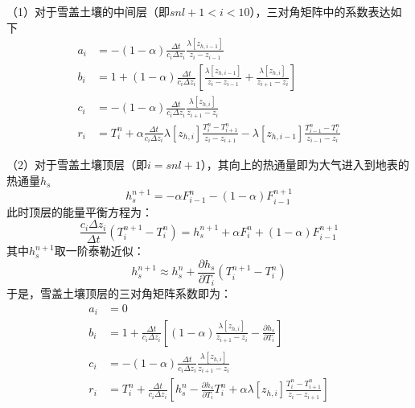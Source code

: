 （1）对于雪盖土壤的中间层（即$snl+1<i<10$），三对角矩阵中的系数表达如下
\begin{equation}
    \begin{aligned}
        a_i &= -\left(1-\alpha \right) \frac{\Delta t}{c_i \Delta z_i} \frac{\lambda \left[z_{h,i-1}\right]}{z_i-z_{i-1}} \\
        b_i &= 1+\left(1-\alpha \right) \frac{\Delta t}{c_i \Delta z_i} \left[\frac{\lambda \left[z_{h,i-1}\right]}{z_i-z_{i-1}} + \frac{\lambda \left[z_{h,i}\right]}{z_{i+1}-z_i}\right] \\
        c_i &= -\left(1-\alpha \right)\frac{\Delta t}{c_i\Delta z_i}\frac{\lambda \left[z_{h,i}\right]}{z_{i+1}-z_i} \\
        r_i &= T_{i}^{n}+\alpha \frac{\Delta t}{c_{i} \Delta z_{i}} \lambda\left[z_{h, i}\right] \frac{T_{i}^{n}-T_{i+1}^{n}}{z_{i}-z_{i+1}}-\lambda\left[z_{h, i-1}\right] \frac{T_{i-1}^{n}-T_{i}^{n}}{z_{i-1}-z_{i}}
    \end{aligned}
\end{equation}

（2）对于雪盖土壤顶层（即$i=snl+1$），其向上的热通量即为大气进入到地表的热通量$h_s$
\begin{equation}
    h^{n+1}_s=-\alpha F^n_{i-1}-\left(1-\alpha\right)F^{n+1}_{i-1}
\end{equation}
此时顶层的能量平衡方程为：
\begin{equation}
    \frac{c_i\Delta z_i}{\Delta t}\left(T^{n+1}_i-T^n_i\right) = h^{n+1}_s+\alpha F^n_i+\left(1-\alpha \right)F^{n+1}_{i-1}
\end{equation}
其中$h^{n+1}_s$取一阶泰勒近似：
\begin{equation}
    h^{n+1}_s \approx h^n_s + \frac{\partial h_s}{\partial T_i}\left(T^{n+1}_i-T^n_i\right)
\end{equation}
于是，雪盖土壤顶层的三对角矩阵系数即为：
\begin{equation}
\begin{aligned}
    a_{i} &= 0 \\ 
    b_{i} &= 1+\frac{\Delta t}{c_{i} \Delta z_{i}}\left[(1-\alpha) \frac{\lambda\left[z_{h, i}\right]}{z_{i+1}-z_{i}}-\frac{\partial h_{s}}{\partial T_{i}}\right] \\
    c_{i} &= -(1-\alpha) \frac{\Delta t}{c_{i} \Delta z_{i}} \frac{\lambda\left[z_{h, i}\right]}{z_{i+1}-z_{i}} \\
    r_{i} &= T_{i}^{n}+\frac{\Delta t}{c_{i} \Delta z_{i}}\left[h_{s}^{n}-\frac{\partial h_{s}}{\partial T_{i}} T_{i}^{n}+\alpha \lambda\left[z_{h, i}\right] \frac{T_{i}^{n}-T_{i+1}^{n}}{z_{i}-z_{i+1}}\right]
\end{aligned}
\end{equation}

